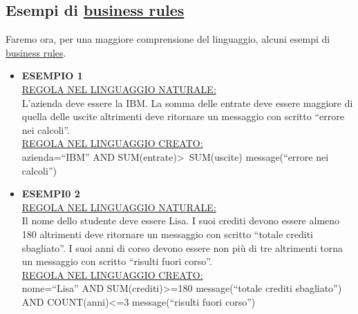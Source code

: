 \subsection{Esempi di \underline{business rules}}
Faremo ora, per una maggiore comprensione del linguaggio, alcuni esempi di \underline{business rules}.
\begin{itemize}
\item \textbf{ESEMPIO 1} \\
\underline{REGOLA NEL LINGUAGGIO NATURALE:} \\
L'azienda deve essere la IBM. La somma delle entrate deve essere maggiore di quella delle uscite altrimenti deve ritornare un messaggio con scritto ``errore nei calcoli''. \\
\underline{REGOLA NEL LINGUAGGIO CREATO:} \\
azienda=``IBM'' AND SUM(entrate)\textgreater\ SUM(uscite) message(``errore nei calcoli'')
\item \textbf{ESEMPI0 2} \\
\underline{REGOLA NEL LINGUAGGIO NATURALE:} \\
Il nome dello studente deve essere Lisa. I suoi crediti devono essere almeno 180 altrimenti deve ritornare un messaggio con scritto ``totale crediti sbagliato''. I suoi anni di corso devono essere non pi\`u di tre altrimenti torna un messaggio con scritto ``risulti fuori corso''.  \\
\underline{REGOLA NEL LINGUAGGIO CREATO:} \\
nome=``Lisa'' AND SUM(crediti)\textgreater =180 message(``totale crediti sbagliato'') AND COUNT(anni)\textless =3 message(``risulti fuori corso'')
\end{itemize}

